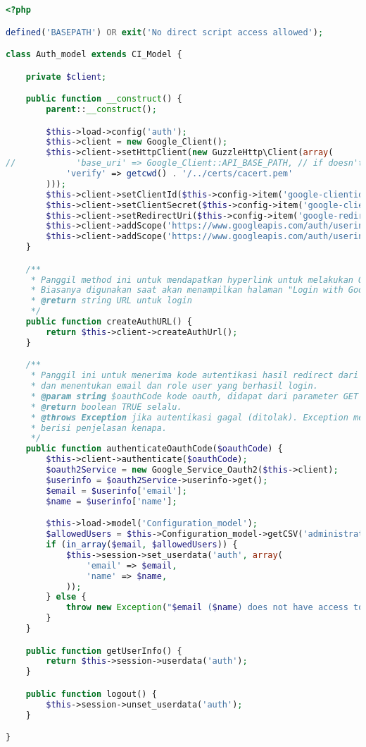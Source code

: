 \begin{lstlisting}[language=php, caption=Auth\_model.php]
<?php

defined('BASEPATH') OR exit('No direct script access allowed');

class Auth_model extends CI_Model {

    private $client;

    public function __construct() {
        parent::__construct();

        $this->load->config('auth');
        $this->client = new Google_Client();
        $this->client->setHttpClient(new GuzzleHttp\Client(array(
//            'base_uri' => Google_Client::API_BASE_PATH, // if doesn't work, try to uncomment this.
            'verify' => getcwd() . '/../certs/cacert.pem'
        )));
        $this->client->setClientId($this->config->item('google-clientid'));
        $this->client->setClientSecret($this->config->item('google-clientsecret'));
        $this->client->setRedirectUri($this->config->item('google-redirecturi'));
        $this->client->addScope('https://www.googleapis.com/auth/userinfo.email');
        $this->client->addScope('https://www.googleapis.com/auth/userinfo.profile');        
    }

    /**
     * Panggil method ini untuk mendapatkan hyperlink untuk melakukan OAuth.
     * Biasanya digunakan saat akan menampilkan halaman "Login with Google".
     * @return string URL untuk login
     */
    public function createAuthURL() {
        return $this->client->createAuthUrl();
    }

    /**
     * Panggil ini untuk menerima kode autentikasi hasil redirect dari Google,
     * dan menentukan email dan role user yang berhasil login.
     * @param string $oauthCode kode oauth, didapat dari parameter GET "code".
     * @return boolean TRUE selalu.
     * @throws Exception jika autentikasi gagal (ditolak). Exception message
     * berisi penjelasan kenapa.
     */
    public function authenticateOauthCode($oauthCode) {
        $this->client->authenticate($oauthCode);
        $oauth2Service = new Google_Service_Oauth2($this->client);
        $userinfo = $oauth2Service->userinfo->get();
        $email = $userinfo['email'];
        $name = $userinfo['name'];

        $this->load->model('Configuration_model');
        $allowedUsers = $this->Configuration_model->getCSV('administrator_emails');
        if (in_array($email, $allowedUsers)) {
            $this->session->set_userdata('auth', array(
                'email' => $email,
                'name' => $name,
            ));
        } else {
            throw new Exception("$email ($name) does not have access to admin page!");
        }
    }

    public function getUserInfo() {
        return $this->session->userdata('auth');
    }

    public function logout() {
        $this->session->unset_userdata('auth');
    }

}
\end{lstlisting}

